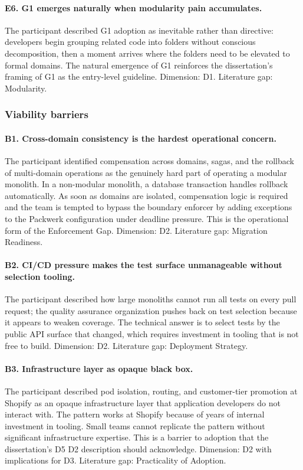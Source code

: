 \paragraph*{E6. G1 emerges naturally when modularity pain accumulates.} The participant described G1 adoption as inevitable rather than directive: developers begin grouping related code into folders without conscious decomposition, then a moment arrives where the folders need to be elevated to formal domains. The natural emergence of G1 reinforces the dissertation's framing of G1 as the entry-level guideline. Dimension: D1. Literature gap: Modularity.

\subsubsection*{Viability barriers}

\paragraph*{B1. Cross-domain consistency is the hardest operational concern.} The participant identified compensation across domains, sagas, and the rollback of multi-domain operations as the genuinely hard part of operating a modular monolith. In a non-modular monolith, a database transaction handles rollback automatically. As soon as domains are isolated, compensation logic is required and the team is tempted to bypass the boundary enforcer by adding exceptions to the Packwerk configuration under deadline pressure. This is the operational form of the Enforcement Gap. Dimension: D2. Literature gap: Migration Readiness.

\paragraph*{B2. CI/CD pressure makes the test surface unmanageable without selection tooling.} The participant described how large monoliths cannot run all tests on every pull request; the quality assurance organization pushes back on test selection because it appears to weaken coverage. The technical answer is to select tests by the public API surface that changed, which requires investment in tooling that is not free to build. Dimension: D2. Literature gap: Deployment Strategy.

\paragraph*{B3. Infrastructure layer as opaque black box.} The participant described pod isolation, routing, and customer-tier promotion at Shopify as an opaque infrastructure layer that application developers do not interact with. The pattern works at Shopify because of years of internal investment in tooling. Small teams cannot replicate the pattern without significant infrastructure expertise. This is a barrier to adoption that the dissertation's D5 D2 description should acknowledge. Dimension: D2 with implications for D3. Literature gap: Practicality of Adoption.

